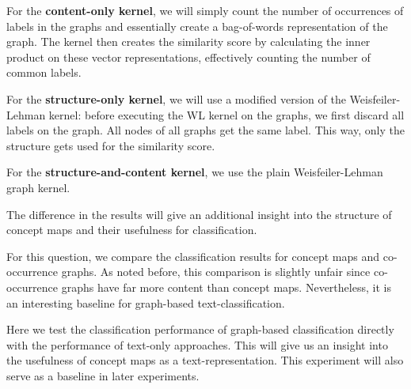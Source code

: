 For the \textbf{content-only kernel}, we will simply count the number of occurrences of labels in the graphs and essentially create a bag-of-words representation of the graph. The kernel then creates the similarity score by calculating the inner product on these vector representations, effectively counting the number of common labels.

For the \textbf{structure-only kernel}, we will use a modified version of the Weisfeiler-Lehman kernel: before executing the WL kernel on the graphs, we first discard all labels on the graph. All nodes of all graphs get the same label. This way, only the structure gets used for the similarity score.

For the \textbf{structure-and-content kernel}, we use the plain Weisfeiler-Lehman graph kernel. 

The difference in the results will give an additional insight into the structure of concept maps and their usefulness for classification.


For this question, we compare the classification results for concept maps and co-occurrence graphs. As noted before, this comparison is slightly unfair since co-occurrence graphs have far more content than concept maps.
Nevertheless, it is an interesting baseline for graph-based text-classification.

Here we test the classification performance of graph-based classification directly with the performance of text-only approaches.
This will give us an insight into the usefulness of concept maps as a text-representation.
This experiment will also serve as a baseline in later experiments.

